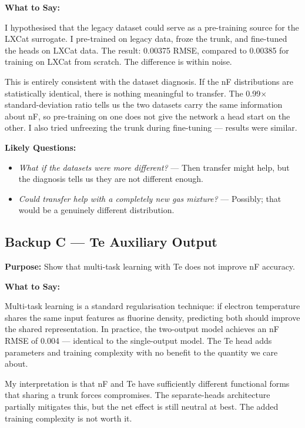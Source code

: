 \documentclass[12pt,a4paper]{article}
\begin{document}
\textbf{What to Say:}

I hypothesised that the legacy dataset could serve as a pre-training
source for the LXCat surrogate. I pre-trained on legacy data, froze
the trunk, and fine-tuned the heads on LXCat data. The result:
0.00375 RMSE, compared to 0.00385 for training on LXCat from scratch.
The difference is within noise.

This is entirely consistent with the dataset diagnosis. If the nF
distributions are statistically identical, there is nothing meaningful
to transfer. The 0.99$\times$ standard-deviation ratio tells us the
two datasets carry the same information about nF, so pre-training on
one does not give the network a head start on the other. I also tried
unfreezing the trunk during fine-tuning --- results were similar.

\textbf{Likely Questions:}
\begin{itemize}
  \item \emph{What if the datasets were more different?}
    --- Then transfer might help, but the diagnosis tells us they
    are not different enough.
  \item \emph{Could transfer help with a completely new gas mixture?}
    --- Possibly; that would be a genuinely different distribution.
\end{itemize}

\bigskip

\subsection*{Backup C --- Te Auxiliary Output}

\textbf{Purpose:} Show that multi-task learning with Te does not
improve nF accuracy.

\textbf{What to Say:}

Multi-task learning is a standard regularisation technique: if
electron temperature shares the same input features as fluorine
density, predicting both should improve the shared representation.
In practice, the two-output model achieves an nF RMSE of 0.004 ---
identical to the single-output model. The Te head adds parameters and
training complexity with no benefit to the quantity we care about.

My interpretation is that nF and Te have sufficiently different
functional forms that sharing a trunk forces compromises. The
separate-heads architecture partially mitigates this, but the net
effect is still neutral at best. The added training complexity is
not worth it.
\end{document}
